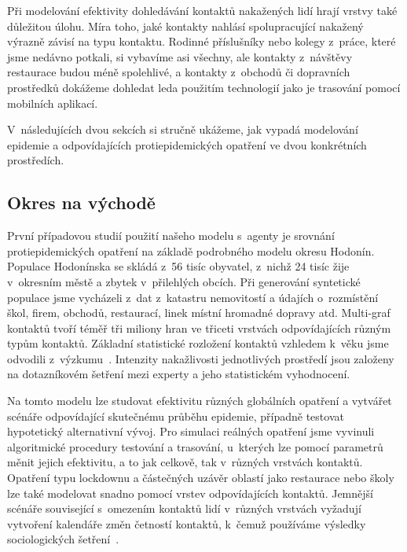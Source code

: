 Při modelování efektivity dohledávání kontaktů nakažených lidí hrají vrstvy také důležitou úlohu. Míra toho, jaké kontakty nahlásí spolupracující nakažený výrazně závisí na typu kontaktu. Rodinné příslušníky nebo kolegy z~práce, které jsme nedávno potkali, si vybavíme asi všechny, ale kontakty z~návštěvy restaurace budou méně spolehlivé, a kontakty z~obchodů či dopravních prostředků dokážeme dohledat leda použitím technologií jako je trasování pomocí mobilních aplikací.

V~následujících dvou sekcích si stručně ukážeme, jak vypadá modelování epidemie a odpovídajících protiepidemických opatření ve dvou konkrétních prostředích. 




\subsection*{Okres na východě}

První případovou studií použití našeho modelu s~agenty je srovnání protiepidemických opatření na základě podrobného modelu okresu Hodonín. Populace Hodonínska se skládá z~56 tisíc obyvatel, z~nichž 24 tisíc žije v~okresním městě a zbytek v~přilehlých obcích. Při generování syntetické populace jsme vycházeli z~dat z~katastru nemovitostí a údajích o~rozmístění škol, firem, obchodů, restaurací, linek místní hromadné dopravy atd. Multi-graf kontaktů tvoří téměř tři miliony hran ve třiceti vrstvách odpovídajících různým typům kontaktů. Základní statistické rozložení kontaktů vzhledem k~věku jsme odvodili z~výzkumu~\cite{Prem_etal2017}. Intenzity nakažlivosti jednotlivých prostředí jsou založeny na dotazníkovém šetření mezi experty a jeho statistickém vyhodnocení. 

Na tomto modelu lze studovat efektivitu různých globálních opatření a vytvářet scénáře odpovídající skutečnému průběhu epidemie, případně testovat hypotetický alternativní vývoj. Pro simulaci reálných opatření jsme vyvinuli algoritmické procedury testování a trasování, u~kterých lze pomocí parametrů měnit jejich efektivitu, a to jak celkově, tak v~různých vrstvách kontaktů. Opatření typu lockdownu a částečných uzávěr oblastí jako restaurace nebo školy lze také modelovat snadno pomocí vrstev odpovídajících kontaktů. Jemnější scénáře související s~omezením kontaktů lidí v~různých vrstvách vyžadují vytvoření kalendáře změn četností kontaktů, k~čemuž používáme výsledky sociologických šetření~\cite{paqcovid}.   

